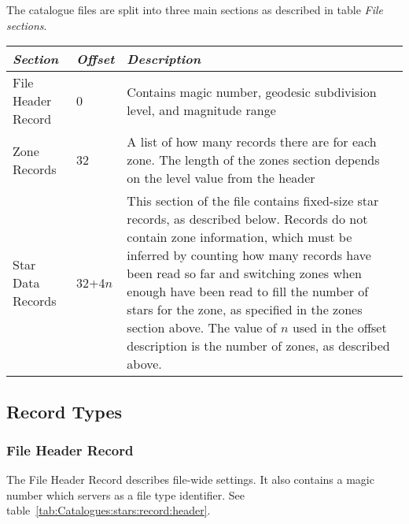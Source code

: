 The catalogue files are split into three main sections as described in
table \emph{File sections}.

\noindent%
\begin{tabularx}{\textwidth}{l l X}\toprule
\emph{Section} & \emph{Offset} & \emph{Description}\\\midrule
File Header Record &  0        & Contains magic number, geodesic subdivision level, and magnitude range\\%
Zone Records       & 32        & A list of how many records there are for each zone.
                                 The length of the zones section depends on the level value from the header\\%
Star Data Records  & 32+4$n$   & This section of the file contains fixed-size star records, as described below. 
                                 Records do not contain zone information, which must be inferred by counting 
                                 how many records have been read so far and switching zones when enough have been read 
                                 to fill the number of stars for the zone, as specified in the zones section above. 
                                 The value of $n$ used in the offset description is the number of zones, as described above.\\\bottomrule
\end{tabularx}

\subsection{Record Types}%
\label{sec:Catalogues:stars:record:types}

\subsubsection{File Header Record}%
\label{sec:Catalogues:stars:record:header}

The File Header Record describes file-wide settings. It also contains a
magic number which servers as a file type identifier. See table~\ref{tab:Catalogues:stars:record:header}.

